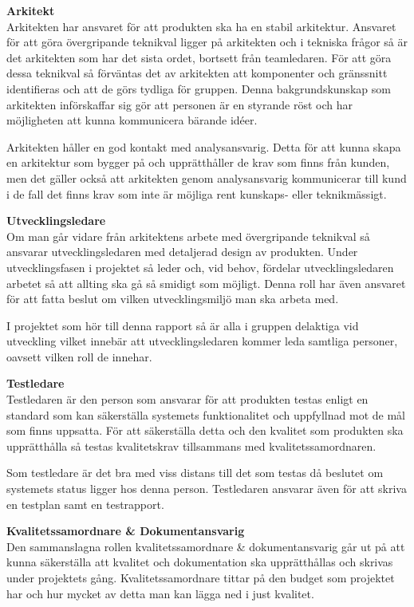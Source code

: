 \textbf{Arkitekt}\\
Arkitekten har ansvaret för att produkten ska ha en stabil arkitektur. Ansvaret för att göra övergripande teknikval ligger på arkitekten och i tekniska frågor så är det arkitekten som har det sista ordet, bortsett från teamledaren. För att göra dessa teknikval så förväntas det av arkitekten att komponenter och gränssnitt identifieras och att de görs tydliga för gruppen. Denna bakgrundskunskap som arkitekten införskaffar sig gör att personen är en styrande röst och har möjligheten att kunna kommunicera bärande idéer.

Arkitekten håller en god kontakt med analysansvarig. Detta för att kunna skapa en arkitektur som bygger på och upprätthåller de krav som finns från kunden, men det gäller också att arkitekten genom analysansvarig kommunicerar till kund i de fall det finns krav som inte är möjliga rent kunskaps- eller teknikmässigt.

\textbf{Utvecklingsledare}\\
Om man går vidare från arkitektens arbete med övergripande teknikval så ansvarar utvecklingsledaren med detaljerad design av produkten. Under utvecklingsfasen i projektet så leder och, vid behov, fördelar utvecklingsledaren arbetet så att allting ska gå så smidigt som möjligt. Denna roll har även ansvaret för att fatta beslut om vilken utvecklingsmiljö man ska arbeta med.

I projektet som hör till denna rapport så är alla i gruppen delaktiga vid utveckling vilket innebär att utvecklingsledaren kommer leda samtliga personer, oavsett vilken roll de innehar.

\textbf{Testledare}\\
Testledaren är den person som ansvarar för att produkten testas enligt en standard som kan säkerställa systemets funktionalitet och uppfyllnad mot de mål som finns uppsatta. För att säkerställa detta och den kvalitet som produkten ska upprätthålla så testas kvalitetskrav tillsammans med kvalitetssamordnaren.

Som testledare är det bra med viss distans till det som testas då beslutet om systemets status ligger hos denna person. Testledaren ansvarar även för att skriva en testplan samt en testrapport.

\textbf{Kvalitetssamordnare \& Dokumentansvarig}\\
Den sammanslagna rollen kvalitetssamordnare \& dokumentansvarig går ut på att kunna säkerställa att kvalitet och dokumentation ska upprätthållas och skrivas under projektets gång. Kvalitetssamordnare tittar på den budget som projektet har och hur mycket av detta man kan lägga ned i just kvalitet.


